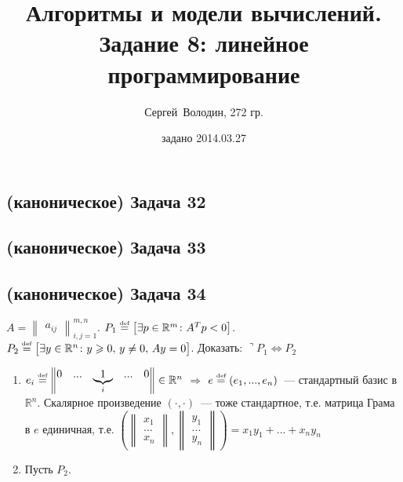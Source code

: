 \documentclass[a4paper]{article}
\date{задано 2014.03.27}
\author{Сергей~Володин, 272 гр.}
\title{Алгоритмы и модели вычислений.\\Задание 8: линейное программирование}
\def\eqdef{\overset{\mbox{\tiny def}}{=}}
\newcommand{\RR}{\mathbb{R}}
\begin{document}
\maketitle
\subsection*{(каноническое) Задача 32}
\subsection*{(каноническое) Задача 33}
\subsection*{(каноническое) Задача 34}
$A=\begin{Vmatrix}
a_{ij}
\end{Vmatrix}_{i,j=1}^{m,n}$. $P_1\eqdef\big[\exists p\in\RR^m\colon A^Tp<0\big]$. $P_2\eqdef\big[\exists y\in\RR^n\colon y\geqslant 0,\,y\neq 0,\,Ay=0\big]$. Доказать: $\urcorner P_1\Leftrightarrow P_2$\begin{enumerate}
\item $e_i\eqdef \begin{Vmatrix}
0 & ... & \underbrace{1}_{i} & ... & 0
\end{Vmatrix}\in\RR^n$ $\Rightarrow$ $e\eqdef(e_1,...,e_n)$~--- стандартный базис в $\RR^n$. Скалярное произведение $(\cdot,\cdot)$~--- тоже стандартное, т.е. матрица Грама в $e$ единичная, т.е. $(\begin{Vmatrix}
x_1\\
...\\
x_n
\end{Vmatrix},
\begin{Vmatrix}
y_1\\
...\\
y_n
\end{Vmatrix})=x_1y_1+...+x_ny_n$
\item Пусть $P_2$. 
\end{enumerate}
\end{document}
